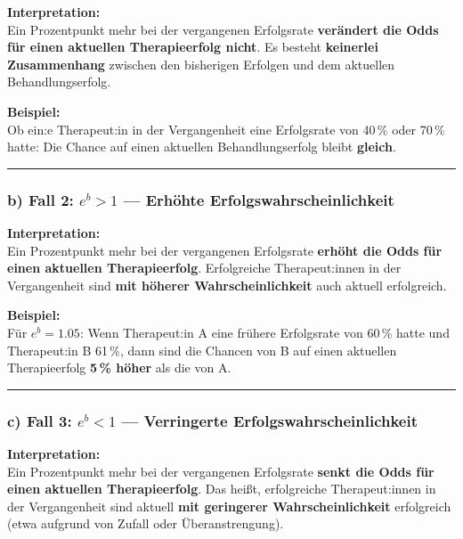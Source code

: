 \documentclass[
]{article}
\begin{document}
\textbf{Interpretation:}\\
Ein Prozentpunkt mehr bei der vergangenen Erfolgsrate \textbf{verändert die Odds für einen aktuellen Therapieerfolg nicht}. Es besteht \textbf{keinerlei Zusammenhang} zwischen den bisherigen Erfolgen und dem aktuellen Behandlungserfolg.

\textbf{Beispiel:}\\
Ob ein:e Therapeut:in in der Vergangenheit eine Erfolgsrate von 40\,\% oder 70\,\% hatte: Die Chance auf einen aktuellen Behandlungserfolg bleibt \textbf{gleich}.

\begin{center}\rule{0.5\linewidth}{0.5pt}\end{center}

\subsubsection{\texorpdfstring{b) Fall 2: \(e^{b} > 1\) --- Erhöhte Erfolgswahrscheinlichkeit}{b) Fall 2: e\^{}\{b\} \textgreater{} 1 --- Erhöhte Erfolgswahrscheinlichkeit}}\label{b-fall-2-eb-1-erhuxf6hte-erfolgswahrscheinlichkeit}

\textbf{Interpretation:}\\
Ein Prozentpunkt mehr bei der vergangenen Erfolgsrate \textbf{erhöht die Odds für einen aktuellen Therapieerfolg}. Erfolgreiche Therapeut:innen in der Vergangenheit sind \textbf{mit höherer Wahrscheinlichkeit} auch aktuell erfolgreich.

\textbf{Beispiel:}\\
Für \(e^{b} = 1.05\): Wenn Therapeut:in A eine frühere Erfolgsrate von 60\,\% hatte und Therapeut:in B 61\,\%, dann sind die Chancen von B auf einen aktuellen Therapieerfolg \textbf{5\,\% höher} als die von A.

\begin{center}\rule{0.5\linewidth}{0.5pt}\end{center}

\subsubsection{\texorpdfstring{c) Fall 3: \(e^{b} < 1\) --- Verringerte Erfolgswahrscheinlichkeit}{c) Fall 3: e\^{}\{b\} \textless{} 1 --- Verringerte Erfolgswahrscheinlichkeit}}\label{c-fall-3-eb-1-verringerte-erfolgswahrscheinlichkeit}

\textbf{Interpretation:}\\
Ein Prozentpunkt mehr bei der vergangenen Erfolgsrate \textbf{senkt die Odds für einen aktuellen Therapieerfolg}. Das heißt, erfolgreiche Therapeut:innen in der Vergangenheit sind aktuell \textbf{mit geringerer Wahrscheinlichkeit} erfolgreich (etwa aufgrund von Zufall oder Überanstrengung).
\end{document}
